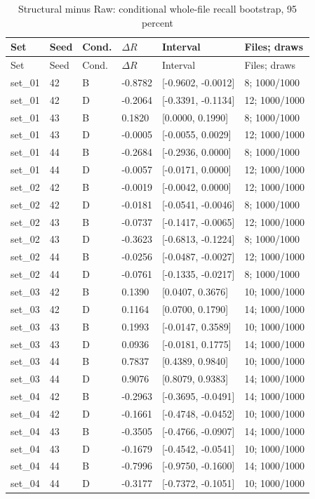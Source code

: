 \documentclass[12pt,a4paper,oneside,openany]{extbook}
\begin{document}
\begin{longtable}{P{1.6cm}P{1.1cm}P{1.2cm}P{1.8cm}P{3.7cm}P{2.9cm}}
\caption{Structural minus Raw: conditional whole-file recall bootstrap, 95 percent}\label{tab:comparison-ci}\\\toprule
Set & Seed & Cond. & $\Delta R$ & Interval & Files; draws\\\midrule\endfirsthead
\toprule
Set & Seed & Cond. & $\Delta R$ & Interval & Files; draws\\\midrule\endhead
set\_01 & 42 & B & -0.8782 & [-0.9602, -0.0012] & 8; 1000/1000\\
set\_01 & 42 & D & -0.2064 & [-0.3391, -0.1134] & 12; 1000/1000\\
set\_01 & 43 & B & 0.1820 & [0.0000, 0.1990] & 8; 1000/1000\\
set\_01 & 43 & D & -0.0005 & [-0.0055, 0.0029] & 12; 1000/1000\\
set\_01 & 44 & B & -0.2684 & [-0.2936, 0.0000] & 8; 1000/1000\\
set\_01 & 44 & D & -0.0057 & [-0.0171, 0.0000] & 12; 1000/1000\\
set\_02 & 42 & B & -0.0019 & [-0.0042, 0.0000] & 12; 1000/1000\\
set\_02 & 42 & D & -0.0181 & [-0.0541, -0.0046] & 8; 1000/1000\\
set\_02 & 43 & B & -0.0737 & [-0.1417, -0.0065] & 12; 1000/1000\\
set\_02 & 43 & D & -0.3623 & [-0.6813, -0.1224] & 8; 1000/1000\\
set\_02 & 44 & B & -0.0256 & [-0.0487, -0.0027] & 12; 1000/1000\\
set\_02 & 44 & D & -0.0761 & [-0.1335, -0.0217] & 8; 1000/1000\\
set\_03 & 42 & B & 0.1390 & [0.0407, 0.3676] & 10; 1000/1000\\
set\_03 & 42 & D & 0.1164 & [0.0700, 0.1790] & 14; 1000/1000\\
set\_03 & 43 & B & 0.1993 & [-0.0147, 0.3589] & 10; 1000/1000\\
set\_03 & 43 & D & 0.0936 & [-0.0181, 0.1775] & 14; 1000/1000\\
set\_03 & 44 & B & 0.7837 & [0.4389, 0.9840] & 10; 1000/1000\\
set\_03 & 44 & D & 0.9076 & [0.8079, 0.9383] & 14; 1000/1000\\
set\_04 & 42 & B & -0.2963 & [-0.3695, -0.0491] & 14; 1000/1000\\
set\_04 & 42 & D & -0.1661 & [-0.4748, -0.0452] & 10; 1000/1000\\
set\_04 & 43 & B & -0.3505 & [-0.4766, -0.0907] & 14; 1000/1000\\
set\_04 & 43 & D & -0.1679 & [-0.4542, -0.0541] & 10; 1000/1000\\
set\_04 & 44 & B & -0.7996 & [-0.9750, -0.1600] & 14; 1000/1000\\
set\_04 & 44 & D & -0.3177 & [-0.7372, -0.1051] & 10; 1000/1000\\
\bottomrule\end{longtable}
\end{document}
